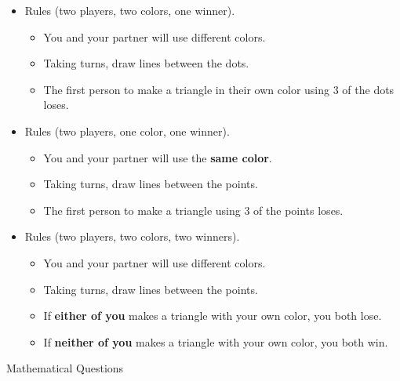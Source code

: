 \documentclass{article}
\begin{document}
    \begin{minipage}[b]{.7\textwidth}
        \begin{itemize}
            \item Rules (two players, two colors, one winner).
            \begin{itemize}
                \item You and your partner will use different colors.
                \item Taking turns, draw lines between the dots.
                \item The first person to make a triangle in their own color using 3 of the dots loses.
            \end{itemize}
            \bigskip
            \item Rules (two players, one color, one winner).
            \begin{itemize}
                \item You and your partner will use the \textbf{same color}.
                \item Taking turns, draw lines between the points.
                \item The first person to make a triangle using 3 of the points loses.
            \end{itemize}
            \bigskip
            \item Rules (two players, two colors, two winners).
            \begin{itemize}
                \item You and your partner will use different colors.
                \item Taking turns, draw lines between the points.
                \item If \textbf{either of you} makes a triangle with your own color, you both lose.
                \item If \textbf{neither of you} makes a triangle with your own color, you both win.
            \end{itemize}
        \end{itemize}
    \end{minipage}
    \begin{minipage}[b]{.3\textwidth}
        \scalebox{.9}{
            
        }
    \end{minipage}

    \hrulefill

    \bigskip
    \begin{Large}Mathematical Questions\end{Large}
\end{document}
